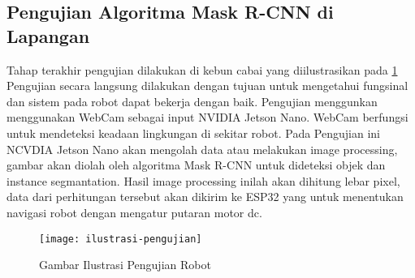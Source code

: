 \subsection{Pengujian Algoritma Mask R-CNN di Lapangan}
Tahap terakhir pengujian dilakukan di kebun cabai yang diilustrasikan pada \cref{fig:ilustrasiuji}  Pengujian secara langsung dilakukan dengan tujuan untuk mengetahui fungsinal dan sistem pada robot dapat bekerja dengan baik. Pengujian menggunkan menggunakan WebCam sebagai input NVIDIA Jetson Nano. WebCam berfungsi untuk mendeteksi keadaan lingkungan di sekitar robot. Pada Pengujian ini NCVDIA Jetson Nano akan mengolah data atau melakukan image processing, gambar akan diolah oleh algoritma Mask R-CNN untuk dideteksi objek dan instance segmantation. Hasil image processing inilah akan dihitung lebar pixel, data dari perhitungan tersebut akan dikirim ke ESP32 yang untuk menentukan navigasi robot dengan mengatur putaran motor dc.

\begin{figure}[H]
	\centering
	\texttt{[image: ilustrasi-pengujian]}
	\caption{Gambar Ilustrasi Pengujian Robot}
	\label{fig:ilustrasiuji}
\end{figure}
